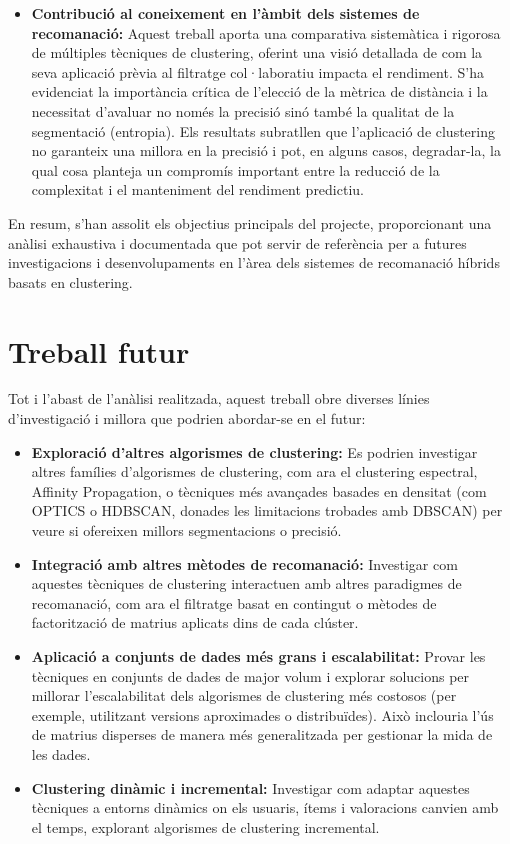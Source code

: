 \documentclass[a4paper,12pt]{report}
\begin{document}
\begin{itemize}
    \item \textbf{Contribució al coneixement en l'àmbit dels sistemes de recomanació:} Aquest treball aporta una comparativa sistemàtica i rigorosa de múltiples tècniques de clustering, oferint una visió detallada de com la seva aplicació prèvia al filtratge col·laboratiu impacta el rendiment. S'ha evidenciat la importància crítica de l'elecció de la mètrica de distància i la necessitat d'avaluar no només la precisió sinó també la qualitat de la segmentació (entropia). Els resultats subratllen que l'aplicació de clustering no garanteix una millora en la precisió i pot, en alguns casos, degradar-la, la qual cosa planteja un compromís important entre la reducció de la complexitat i el manteniment del rendiment predictiu.
\end{itemize}

En resum, s'han assolit els objectius principals del projecte, proporcionant una anàlisi exhaustiva i documentada que pot servir de referència per a futures investigacions i desenvolupaments en l'àrea dels sistemes de recomanació híbrids basats en clustering.

\section{Treball futur}
\label{sec:treball_futur}

Tot i l'abast de l'anàlisi realitzada, aquest treball obre diverses línies d'investigació i millora que podrien abordar-se en el futur:

\begin{itemize}
    \item \textbf{Exploració d'altres algorismes de clustering:} Es podrien investigar altres famílies d'algorismes de clustering, com ara el clustering espectral, Affinity Propagation, o tècniques més avançades basades en densitat (com OPTICS o HDBSCAN, donades les limitacions trobades amb DBSCAN) per veure si ofereixen millors segmentacions o precisió.

    \item \textbf{Integració amb altres mètodes de recomanació:} Investigar com aquestes tècniques de clustering interactuen amb altres paradigmes de recomanació, com ara el filtratge basat en contingut o mètodes de factorització de matrius aplicats dins de cada clúster.

    \item \textbf{Aplicació a conjunts de dades més grans i escalabilitat:} Provar les tècniques en conjunts de dades de major volum i explorar solucions per millorar l'escalabilitat dels algorismes de clustering més costosos (per exemple, utilitzant versions aproximades o distribuïdes). Això inclouria l'ús de matrius disperses de manera més generalitzada per gestionar la mida de les dades.

    \item \textbf{Clustering dinàmic i incremental:} Investigar com adaptar aquestes tècniques a entorns dinàmics on els usuaris, ítems i valoracions canvien amb el temps, explorant algorismes de clustering incremental.
\end{itemize}
\end{document}
